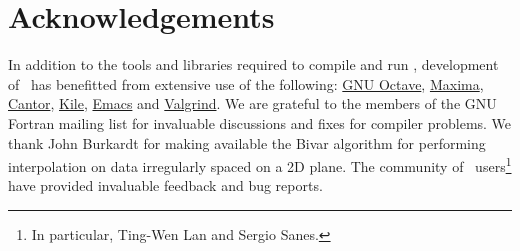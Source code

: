 \chapter{Acknowledgements}

In addition to the tools and libraries required to compile and run \glc, development of \glc\ has benefitted from extensive use of the following: \href{http://www.gnu.org/software/octave/}{{\sc GNU Octave}}, \href{http://maxima.sourceforge.net/}{{\sc Maxima}}, \href{http://edu.kde.org/cantor/}{{\sc Cantor}}, \href{http://kile.sourceforge.net/}{{\sc Kile}}, \href{http://www.gnu.org/software/emacs/}{{\sc Emacs}} and \href{http://valgrind.org/}{{\sc Valgrind}}. We are grateful to the members of the {\sc GNU Fortran} mailing list for invaluable discussions and fixes for compiler problems. We thank John Burkardt for making available the {\sc Bivar} algorithm for performing interpolation on data irregularly spaced on a 2D plane. The community of \glc\ users\footnote{In particular, Ting-Wen Lan and Sergio Sanes.} have provided invaluable feedback and bug reports.
